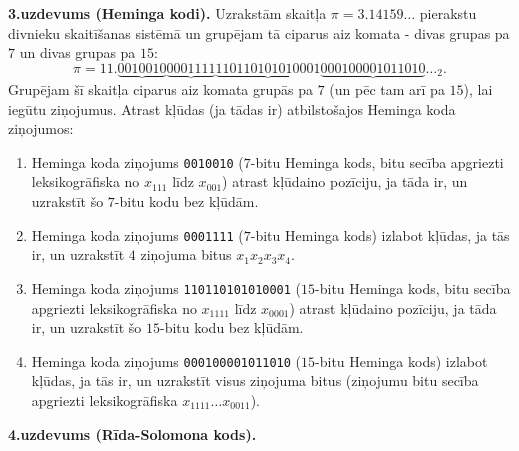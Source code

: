 \documentclass[a4paper,12pt]{article}
\begin{document}
\vspace{10pt}
{\bf 3.uzdevums (Heminga kodi).} 
Uzrakstām skaitļa $\pi = 3.14159\ldots$ pierakstu divnieku skaitīšanas sistēmā un 
grupējam tā ciparus aiz komata - divas grupas pa $7$ un divas grupas pa $15$:
$$\pi = 11.\underbrace{0010010}\underbrace{0001111}\underbrace{110110101010001}\underbrace{000100001011010}\ldots_2.$$
Grupējam šī skaitļa ciparus aiz komata grupās pa $7$ (un pēc tam arī pa
$15$), lai iegūtu ziņojumus. Atrast kļūdas (ja tādas ir) atbilstošajos Heminga koda ziņojumos:
\begin{enumerate}[label=(\alph*)]
\item Heminga koda ziņojums {\tt 0010010} ($7$-bitu Heminga kods, bitu secība apgriezti leksikogrāfiska
\textendash{} no $x_{111}$ līdz $x_{001}$) \textendash{} atrast kļūdaino pozīciju, ja tāda ir, un uzrakstīt šo $7$-bitu kodu bez kļūdām.
\item Heminga koda ziņojums {\tt 0001111} ($7$-bitu Heminga kods) \textendash{} izlabot kļūdas, ja tās ir, un uzrakstīt $4$ ziņojuma bitus $x_1x_2x_3x_4$. 
\item Heminga koda ziņojums {\tt 110110101010001} ($15$-bitu Heminga kods, bitu secība apgriezti leksikogrāfiska 
\textendash{} no $x_{1111}$ līdz $x_{0001}$) \textendash{} atrast kļūdaino pozīciju, ja tāda ir, un uzrakstīt šo $15$-bitu kodu bez kļūdām.
\item Heminga koda ziņojums {\tt 000100001011010} ($15$-bitu Heminga kods) \textendash{} 
izlabot kļūdas, ja tās ir, un uzrakstīt visus ziņojuma bitus (ziņojumu bitu secība apgriezti leksikogrāfiska $x_{1111}\ldots{}x_{0011}$).
\end{enumerate}



\vspace{10pt}
{\bf 4.uzdevums (Rīda-Solomona kods).}
\end{document}

